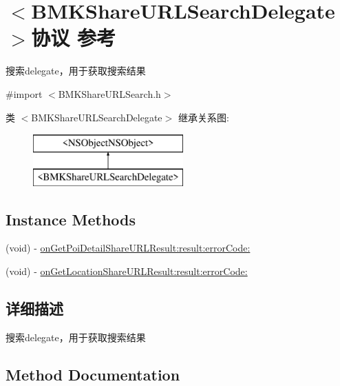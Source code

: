 \hypertarget{protocol_b_m_k_share_u_r_l_search_delegate-p}{}\section{$<$B\+M\+K\+Share\+U\+R\+L\+Search\+Delegate$>$协议 参考}
\label{protocol_b_m_k_share_u_r_l_search_delegate-p}


搜索delegate，用于获取搜索结果  




{\ttfamily \#import $<$B\+M\+K\+Share\+U\+R\+L\+Search.\+h$>$}

类 $<$B\+M\+K\+Share\+U\+R\+L\+Search\+Delegate$>$ 继承关系图\+:\begin{figure}[H]
\begin{center}
\leavevmode
\includegraphics[height=2.000000cm]{protocol_b_m_k_share_u_r_l_search_delegate-p}
\end{center}
\end{figure}
\subsection*{Instance Methods}
\begin{DoxyCompactItemize}
\item 
(void) -\/ \hyperlink{protocol_b_m_k_share_u_r_l_search_delegate-p_a585f4e1aa26bb11f59bd624c0e513cd6}{on\+Get\+Poi\+Detail\+Share\+U\+R\+L\+Result\+:result\+:error\+Code\+:}
\item 
(void) -\/ \hyperlink{protocol_b_m_k_share_u_r_l_search_delegate-p_a856efc4ec1a61f942bd5c025f29fc83c}{on\+Get\+Location\+Share\+U\+R\+L\+Result\+:result\+:error\+Code\+:}
\end{DoxyCompactItemize}


\subsection{详细描述}
搜索delegate，用于获取搜索结果 

\subsection{Method Documentation}
\hypertarget{protocol_b_m_k_share_u_r_l_search_delegate-p_a856efc4ec1a61f942bd5c025f29fc83c}{}
